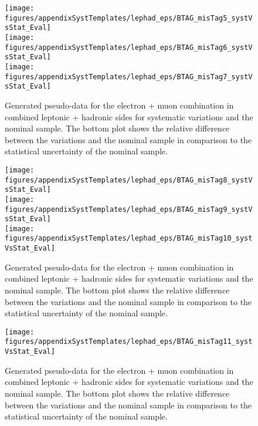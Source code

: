 \begin{figure}[!hb]
\begin{center}
        \texttt{[image: figures/appendixSystTemplates/lephad\_eps/BTAG\_misTag5\_systVsStat\_Eval]}\\
        \texttt{[image: figures/appendixSystTemplates/lephad\_eps/BTAG\_misTag6\_systVsStat\_Eval]}\\
        \texttt{[image: figures/appendixSystTemplates/lephad\_eps/BTAG\_misTag7\_systVsStat\_Eval]}
  
        \caption{Generated pseudo-data for the electron + muon combination in combined leptonic + hadronic sides for systematic variations and the nominal \ttbar sample. The bottom plot shows the relative difference between the variations and the nominal sample in comparison to the statistical uncertainty of the nominal sample.}   
        \label{fig:systematicVar_lephad_Btag_3_2}
        \end{center}                          
        \end{figure}

\begin{figure}[!hb]
\begin{center}
        \texttt{[image: figures/appendixSystTemplates/lephad\_eps/BTAG\_misTag8\_systVsStat\_Eval]}\\
        \texttt{[image: figures/appendixSystTemplates/lephad\_eps/BTAG\_misTag9\_systVsStat\_Eval]}\\
        \texttt{[image: figures/appendixSystTemplates/lephad\_eps/BTAG\_misTag10\_systVsStat\_Eval]}\\

        \caption{Generated pseudo-data for the electron + muon combination in combined leptonic + hadronic sides for systematic variations and the nominal \ttbar sample. The bottom plot shows the relative difference between the variations and the nominal sample in comparison to the statistical uncertainty of the nominal sample.}   
        \label{fig:systematicVar_lephad_Btag_4_1}
        \end{center}                          
        \end{figure}

\begin{figure}[!hb]
\begin{center}
        \texttt{[image: figures/appendixSystTemplates/lephad\_eps/BTAG\_misTag11\_systVsStat\_Eval]}\\

        \caption{Generated pseudo-data for the electron + muon combination in combined leptonic + hadronic sides for systematic variations and the nominal \ttbar sample. The bottom plot shows the relative difference between the variations and the nominal sample in comparison to the statistical uncertainty of the nominal sample.}   
        \label{fig:systematicVar_lephad_Btag_4_2}
        \end{center}                          
        \end{figure}



